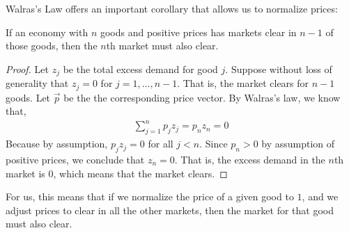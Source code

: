 Walras's Law offers an important corollary that allows us to normalize prices:
\begin{corollary*}
    If an economy with $n$ goods and positive prices has markets clear in $n - 1$ of those goods, then the $n$th market must also clear.
\end{corollary*}

\begin{proof}
    Let $z_j$ be the total excess demand for good $j$. Suppose without loss of generality that $z_j = 0$ for $j = 1, \dots, n - 1$. That is, the market clears for $n - 1$ goods. Let $\vec{p}$ be the the corresponding price vector. By Walras's law, we know that, 
    \begin{align*}
        \sum_{j = 1}^n p_j z_j = p_n z_n = 0
    \end{align*}
    Because by assumption, $p_j z_j = 0$ for all $j < n$. Since $p_n > 0$ by assumption of positive prices, we conclude that $z_n = 0$. That is, the excess demand in the $n$th market is 0, which means that the market clears. 
\end{proof}
For us, this means that if we normalize the price of a given good to $1$, and we adjust prices to clear in all the other markets, then the market for that good must also clear. 